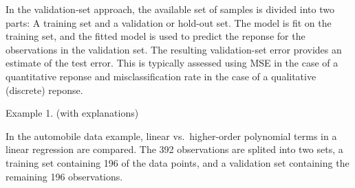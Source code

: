 \documentclass[]{report}
\newenvironment{Shaded}{\begin{snugshade}}{\end{snugshade}}
\newcommand{\KeywordTok}[1]{\textcolor[rgb]{0.13,0.29,0.53}{\textbf{#1}}}
\newcommand{\DecValTok}[1]{\textcolor[rgb]{0.00,0.00,0.81}{#1}}
\newcommand{\StringTok}[1]{\textcolor[rgb]{0.31,0.60,0.02}{#1}}
\newcommand{\CommentTok}[1]{\textcolor[rgb]{0.56,0.35,0.01}{\textit{#1}}}
\newcommand{\ControlFlowTok}[1]{\textcolor[rgb]{0.13,0.29,0.53}{\textbf{#1}}}
\newcommand{\OperatorTok}[1]{\textcolor[rgb]{0.81,0.36,0.00}{\textbf{#1}}}
\newcommand{\NormalTok}[1]{#1}
\begin{document}
In the validation-set approach, the available set of samples is divided
into two parts: A training set and a validation or hold-out set. The
model is fit on the training set, and the fitted model is used to
predict the reponse for the observations in the validation set. The
resulting validation-set error provides an estimate of the test error.
This is typically assessed using MSE in the case of a quantitative
reponse and misclassification rate in the case of a qualitative
(discrete) reponse.

Example 1. (with explanations)

In the automobile data example, linear vs.~higher-order polynomial terms
in a linear regression are compared. The 392 observations are splited
into two sets, a training set containing 196 of the data points, and a
validation set containing the remaining 196 observations.

\begin{Shaded}
\end{Shaded}
\end{document}
